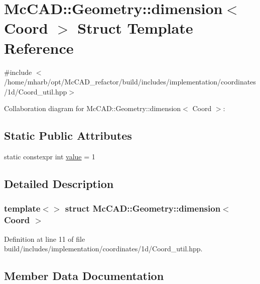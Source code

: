 \hypertarget{structMcCAD_1_1Geometry_1_1dimension_3_01Coord_01_4}{}\section{Mc\+C\+AD\+:\+:Geometry\+:\+:dimension$<$ Coord $>$ Struct Template Reference}
\label{structMcCAD_1_1Geometry_1_1dimension_3_01Coord_01_4}


{\ttfamily \#include $<$/home/mharb/opt/\+Mc\+C\+A\+D\+\_\+refactor/build/includes/implementation/coordinates/1d/\+Coord\+\_\+util.\+hpp$>$}



Collaboration diagram for Mc\+C\+AD\+:\+:Geometry\+:\+:dimension$<$ Coord $>$\+:
\subsection*{Static Public Attributes}
\begin{DoxyCompactItemize}
\item 
static constexpr int \hyperlink{structMcCAD_1_1Geometry_1_1dimension_3_01Coord_01_4_aabbf0818067a2ac0d8640d03d9991391}{value} = 1
\end{DoxyCompactItemize}


\subsection{Detailed Description}
\subsubsection*{template$<$$>$\newline
struct Mc\+C\+A\+D\+::\+Geometry\+::dimension$<$ Coord $>$}



Definition at line 11 of file build/includes/implementation/coordinates/1d/\+Coord\+\_\+util.\+hpp.



\subsection{Member Data Documentation}
\mbox{\label{structMcCAD_1_1Geometry_1_1dimension_3_01Coord_01_4_aabbf0818067a2ac0d8640d03d9991391}} 
